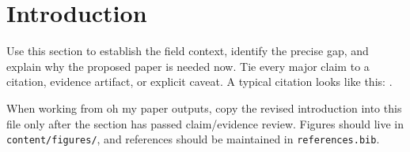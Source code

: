 \section{Introduction}

Use this section to establish the field context, identify the precise gap, and explain why the proposed paper is needed now. Tie every major claim to a citation, evidence artifact, or explicit caveat. A typical citation looks like this: \citep{lamport1994latex}.

When working from oh my paper outputs, copy the revised introduction into this file only after the section has passed claim/evidence review. Figures should live in \texttt{content/figures/}, and references should be maintained in \texttt{references.bib}.
